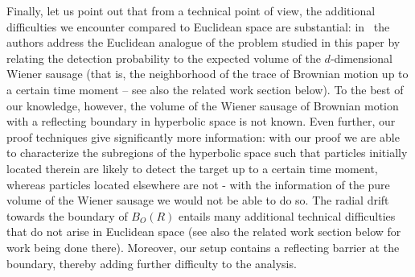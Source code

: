 \smallskip
Finally, let us point out that from a technical point of view, the additional difficulties we encounter compared to Euclidean space are substantial: in~\cite{Peres2010} the authors address the Euclidean analogue of the problem studied in this paper by relating the detection probability to the expected volume of the $d$-dimensional Wiener sausage (that is, the neighborhood of the trace of Brownian motion up to a certain time moment -- see also the related work section below). To the best of our knowledge, however, the volume of the Wiener sausage of Brownian motion with a reflecting boundary in hyperbolic space is not known. Even further, our proof techniques give significantly more information: with our proof we are able to characterize the subregions of the hyperbolic space such that particles initially located therein are likely to detect the target up to a certain time moment, whereas particles located elsewhere are not - with the information of the pure volume of the Wiener sausage we would not be able to do so. %
The radial drift towards the boundary of $B_O(R)$ entails many additional technical difficulties that do not arise in Euclidean space (see also the related work section below for work being done there). Moreover, our setup contains a reflecting barrier at the boundary, thereby adding further difficulty to the analysis.
